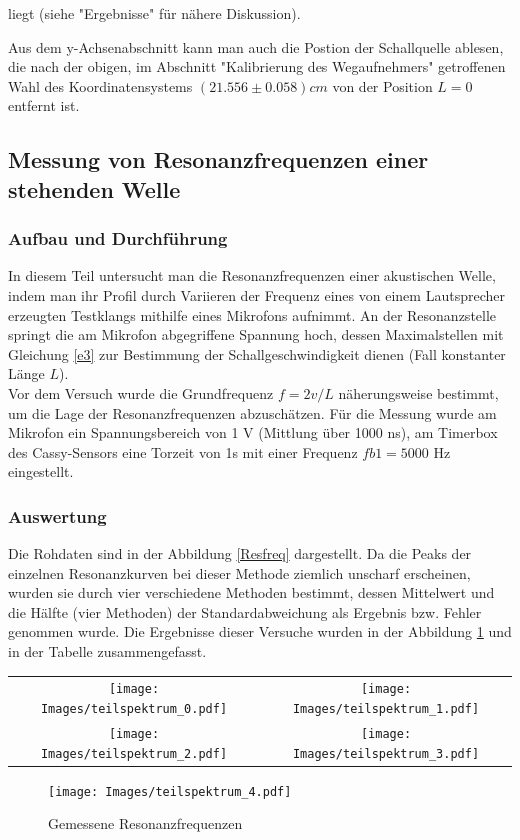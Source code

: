 \documentclass[]{article}
\begin{document}
liegt (siehe "Ergebnisse" für nähere Diskussion).

Aus dem y-Achsenabschnitt kann man auch die Postion der Schallquelle ablesen, die nach der obigen, im Abschnitt "Kalibrierung des Wegaufnehmers" getroffenen Wahl des Koordinatensystems $(21.556 \pm 0.058)cm$ von der Position $L=0$ entfernt ist.

	
	\subsection{Messung von Resonanzfrequenzen einer stehenden Welle}
	\subsubsection{Aufbau und Durchführung}
	In diesem Teil untersucht man die Resonanzfrequenzen einer akustischen Welle, indem man ihr Profil durch Variieren der Frequenz eines von einem Lautsprecher erzeugten Testklangs mithilfe eines Mikrofons aufnimmt. An der Resonanzstelle springt die am Mikrofon abgegriffene Spannung hoch, dessen Maximalstellen mit Gleichung \ref{e3} zur Bestimmung der Schallgeschwindigkeit dienen (Fall konstanter Länge $L$).\\
	Vor dem Versuch wurde die Grundfrequenz $f=2v/L$ näherungsweise bestimmt, um die Lage der Resonanzfrequenzen abzuschätzen. Für die Messung wurde  am Mikrofon ein Spannungsbereich von 1 V (Mittlung über 1000 ns), am Timerbox des Cassy-Sensors eine Torzeit von 1s mit einer Frequenz $fb1=5000$ Hz eingestellt.
	
	\subsubsection{Auswertung}
	
	Die Rohdaten sind in der Abbildung \ref{Resfreq} dargestellt. Da die Peaks der einzelnen Resonanzkurven bei dieser Methode ziemlich unscharf erscheinen, wurden sie durch vier verschiedene Methoden bestimmt, dessen Mittelwert und die Hälfte (vier Methoden) der Standardabweichung als Ergebnis bzw. Fehler genommen wurde. Die Ergebnisse dieser Versuche wurden in der Abbildung \ref{Resfreq_teil} und in der Tabelle zusammengefasst.\\
	\begin{center}
	\begin{tabular}{cc}
		\texttt{[image: Images/teilspektrum\_0.pdf]}& \texttt{[image: Images/teilspektrum\_1.pdf]}\\
		\texttt{[image: Images/teilspektrum\_2.pdf]}& \texttt{[image: Images/teilspektrum\_3.pdf]}\\		 
	\end{tabular} 
	\begin{figure}[h]
		\begin{center}
			\texttt{[image: Images/teilspektrum\_4.pdf]}
			\caption{Gemessene Resonanzfrequenzen}
			\label{Resfreq_teil}
		\end{center}
	\end{figure}
	\end{center}
 
\end{document}
